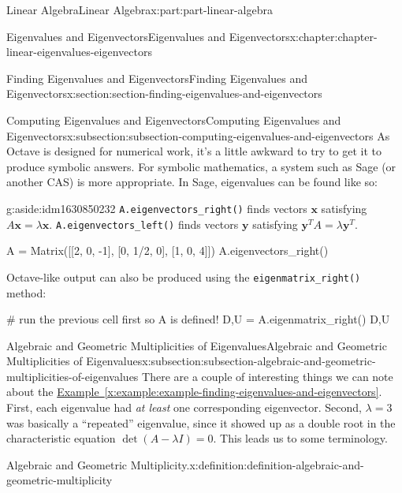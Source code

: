 \documentclass[twoside,10pt,]{book}
\newcommand{\xreffont}{\relax}
\newcommand{\mono}[1]{\texttt{#1}}
\numberwithin{equation}{part}
\providecommand{\vb}[1]{\mathbf{#1}}
\begin{document}
\begin{partptx}{Linear Algebra}{}{Linear Algebra}{}{}{x:part:part-linear-algebra}
\begin{chapterptx}{Eigenvalues and Eigenvectors}{}{Eigenvalues and Eigenvectors}{}{}{x:chapter:chapter-linear-eigenvalues-eigenvectors}
\begin{sectionptx}{Finding Eigenvalues and Eigenvectors}{}{Finding Eigenvalues and Eigenvectors}{}{}{x:section:section-finding-eigenvalues-and-eigenvectors}
\begin{subsectionptx}{Computing Eigenvalues and Eigenvectors}{}{Computing Eigenvalues and Eigenvectors}{}{}{x:subsection:subsection-computing-eigenvalues-and-eigenvectors}
As Octave is designed for numerical work, it's a little awkward to try to get it to produce symbolic answers. For symbolic mathematics, a system such as Sage (or another CAS) is more appropriate. In Sage, eigenvalues can be found like so: \begin{aside}{}{g:aside:idm1630850232}%
\mono{A.eigenvectors\_right()} finds vectors \(\vb{x}\) satisfying \(A\vb{x} = \lambda \vb{x}\). \mono{A.eigenvectors\_left()} finds vectors \(\vb{y}\) satisfying \(\vb{y}^{T}A = \lambda\vb{y}^{T}\).%
\end{aside}
%
\begin{sageinput}
A = Matrix([[2, 0, -1], [0, 1/2, 0], [1, 0, 4]])
A.eigenvectors_right()
\end{sageinput}
Octave-like output can also be produced using the \mono{eigenmatrix\_right()} method:%
\begin{sageinput}
# run the previous cell first so A is defined!
D,U = A.eigenmatrix_right()
D,U
\end{sageinput}
\end{subsectionptx}
%
%
\typeout{************************************************}
\typeout{************************************************}
%
\begin{subsectionptx}{Algebraic and Geometric Multiplicities of Eigenvalues}{}{Algebraic and Geometric Multiplicities of Eigenvalues}{}{}{x:subsection:subsection-algebraic-and-geometric-multiplicities-of-eigenvalues}
There are a couple of interesting things we can note about the \hyperref[x:example:example-finding-eigenvalues-and-eigenvectors]{Example~{\xreffont\ref{x:example:example-finding-eigenvalues-and-eigenvectors}}}. First, each eigenvalue had \emph{at least} one corresponding eigenvector. Second, \(\lambda=3\) was basically a ``repeated'' eigenvalue, since it showed up as a double root in the characteristic equation \(\det(A-\lambda I)=0\). This leads us to some terminology.%
\begin{definition}{Algebraic and Geometric Multiplicity.}{x:definition:definition-algebraic-and-geometric-multiplicity}%
%

\end{definition}
\end{subsectionptx}
\end{sectionptx}
\end{chapterptx}
\end{partptx}
\end{document}
